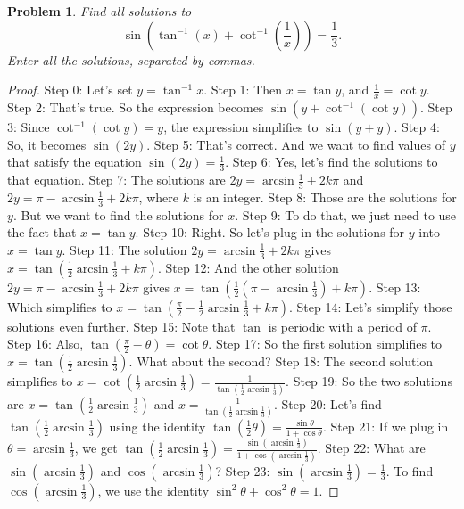 \documentclass{article}
\newtheorem{theorem}{Problem}
\begin{document}
\begin{theorem}
Find all solutions to\n\[\sin \left( \tan^{-1} (x) + \cot^{-1} \left( \frac{1}{x} \right) \right) = \frac{1}{3}.\]Enter all the solutions, separated by commas.
\end{theorem}

\begin{proof}
Step 0: Let's set $y = \tan^{-1} x$.
Step 1: Then $x = \tan y$, and $\frac{1}{x} = \cot y$.
Step 2: That's true. So the expression becomes $\sin (y + \cot^{-1} (\cot y))$.
Step 3: Since $\cot^{-1} (\cot y) = y$, the expression simplifies to $\sin (y + y)$.
Step 4: So, it becomes $\sin (2y)$.
Step 5: That's correct. And we want to find values of $y$ that satisfy the equation $\sin (2y) = \frac{1}{3}$.
Step 6: Yes, let's find the solutions to that equation.
Step 7: The solutions are $2y = \arcsin \frac{1}{3} + 2k\pi$ and $2y = \pi - \arcsin \frac{1}{3} + 2k\pi$, where $k$ is an integer.
Step 8: Those are the solutions for $y$. But we want to find the solutions for $x$.
Step 9: To do that, we just need to use the fact that $x = \tan y$.
Step 10: Right. So let's plug in the solutions for $y$ into $x = \tan y$.
Step 11: The solution $2y = \arcsin \frac{1}{3} + 2k\pi$ gives $x = \tan (\frac{1}{2} \arcsin \frac{1}{3} + k\pi)$.
Step 12: And the other solution $2y = \pi - \arcsin \frac{1}{3} + 2k\pi$ gives $x = \tan (\frac{1}{2} (\pi - \arcsin \frac{1}{3}) + k\pi)$.
Step 13: Which simplifies to $x = \tan (\frac{\pi}{2} - \frac{1}{2} \arcsin \frac{1}{3} + k\pi)$.
Step 14: Let's simplify those solutions even further.
Step 15: Note that $\tan$ is periodic with a period of $\pi$.
Step 16: Also, $\tan (\frac{\pi}{2} - \theta) = \cot \theta$.
Step 17: So the first solution simplifies to $x = \tan (\frac{1}{2} \arcsin \frac{1}{3})$. What about the second?
Step 18: The second solution simplifies to $x = \cot (\frac{1}{2} \arcsin \frac{1}{3}) = \frac{1}{\tan (\frac{1}{2} \arcsin \frac{1}{3})}$.
Step 19: So the two solutions are $x = \tan (\frac{1}{2} \arcsin \frac{1}{3})$ and $x = \frac{1}{\tan (\frac{1}{2} \arcsin \frac{1}{3})}$.
Step 20: Let's find $\tan (\frac{1}{2} \arcsin \frac{1}{3})$ using the identity $\tan (\frac{1}{2} \theta) = \frac{\sin \theta}{1 + \cos \theta}$.
Step 21: If we plug in $\theta = \arcsin \frac{1}{3}$, we get $\tan (\frac{1}{2} \arcsin \frac{1}{3}) = \frac{\sin (\arcsin \frac{1}{3})}{1 + \cos (\arcsin \frac{1}{3})}$.
Step 22: What are $\sin (\arcsin \frac{1}{3})$ and $\cos (\arcsin \frac{1}{3})$?
Step 23: $\sin (\arcsin \frac{1}{3}) = \frac{1}{3}$. To find $\cos (\arcsin \frac{1}{3})$, we use the identity $\sin^2 \theta + \cos^2 \theta = 1$.

\end{proof}
\end{document}
